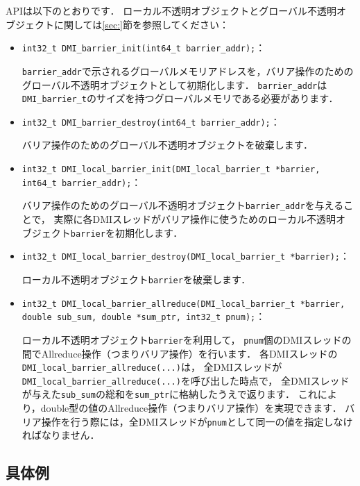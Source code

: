 \documentclass[report,12pt]{jsbook}
\begin{document}
APIは以下のとおりです．
ローカル不透明オブジェクトとグローバル不透明オブジェクトに関しては\ref{sec:}節を参照してください：
\begin{itemize}
\item \texttt{int32\_t DMI\_barrier\_init(int64\_t barrier\_addr);}：
  
  \texttt{barrier\_addr}で示されるグローバルメモリアドレスを，バリア操作のためのグローバル不透明オブジェクトとして初期化します．
  \texttt{barrier\_addr}は\texttt{DMI\_barrier\_t}のサイズを持つグローバルメモリである必要があります．
\item \texttt{int32\_t DMI\_barrier\_destroy(int64\_t barrier\_addr);}：
  
  バリア操作のためのグローバル不透明オブジェクトを破棄します．
\item \texttt{int32\_t DMI\_local\_barrier\_init(DMI\_local\_barrier\_t *barrier, int64\_t barrier\_addr);}：
  
  バリア操作のためのグローバル不透明オブジェクト\texttt{barrier\_addr}を与えることで，
  実際に各DMIスレッドがバリア操作に使うためのローカル不透明オブジェクト\texttt{barrier}を初期化します．
\item \texttt{int32\_t DMI\_local\_barrier\_destroy(DMI\_local\_barrier\_t *barrier);}：
  
  ローカル不透明オブジェクト\texttt{barrier}を破棄します．
\item \texttt{int32\_t DMI\_local\_barrier\_allreduce(DMI\_local\_barrier\_t *barrier, double sub\_sum, double *sum\_ptr, int32\_t pnum);}：
  
  ローカル不透明オブジェクト\texttt{barrier}を利用して，
  \texttt{pnum}個のDMIスレッドの間でAllreduce操作（つまりバリア操作）を行います．
  各DMIスレッドの\texttt{DMI\_local\_barrier\_allreduce(...)}は，
  全DMIスレッドが\texttt{DMI\_local\_barrier\_allreduce(...)}を呼び出した時点で，
  全DMIスレッドが与えた\texttt{sub\_sum}の総和を\texttt{sum\_ptr}に格納したうえで返ります．
  これにより，double型の値のAllreduce操作（つまりバリア操作）を実現できます．
  バリア操作を行う際には，全DMIスレッドが\texttt{pnum}として同一の値を指定しなければなりません．
\end{itemize}

\subsection{具体例}
\end{document}
